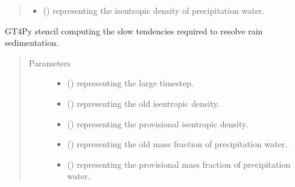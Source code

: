 \documentclass[letterpaper,10pt,english]{sphinxmanual}
\begin{document}
\begin{fulllineitems}
\begin{fulllineitems}
\begin{quote}
\begin{description}
\begin{itemize}
\item {} 
 () \textendash{}  representing the isentropic density of precipitation water.

\end{itemize}


\end{description}\end{quote}

\end{fulllineitems}


\begin{fulllineitems}
\label{\detokenize{api:dycore.prognostic_isentropic_centered.PrognosticIsentropicCentered._stencil_computing_slow_tendencies_defs}}
GT4Py stencil computing the slow tendencies required to resolve rain sedimentation.
\begin{quote}\begin{description}
\item[{Parameters}] \leavevmode\begin{itemize}
\item {} 
 () \textendash{}  representing the large timestep.

\item {} 
 () \textendash{}  representing the old isentropic density.

\item {} 
 () \textendash{}  representing the provisional isentropic density.

\item {} 
 () \textendash{}  representing the old mass fraction of precipitation water.

\item {} 
 () \textendash{}  representing the provisional mass fraction of precipitation water.


\end{itemize}
\end{description}
\end{quote}
\end{fulllineitems}
\end{fulllineitems}
\end{document}
